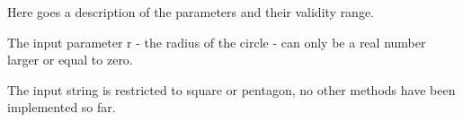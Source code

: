 Here goes a description of the parameters and their validity range.


\begin{DoxyItemize}
\item The input parameter {\ttfamily r} -\/ the radius of the circle -\/ can only be a real number larger or equal to zero.
\item The input string is restricted to {\ttfamily square} or {\ttfamily pentagon}, no other methods have been implemented so far. 
\end{DoxyItemize}